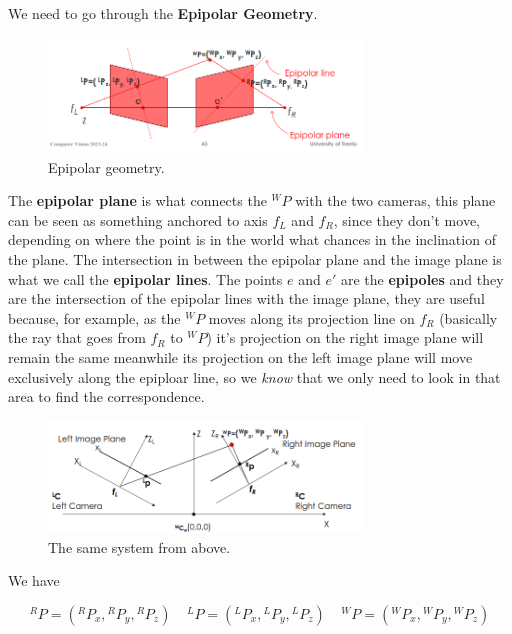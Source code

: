 We need to go through the \textbf{Epipolar Geometry}.

\begin{figure}[H]
    \centering
    \includegraphics[width=0.75\textwidth]{Figures/epipolar.png}
    \caption{Epipolar geometry.}
    \label{fig:epipolar}
\end{figure}

The \textbf{epipolar plane} is what connects the  \({}^WP\) with the two cameras, this plane can be seen as something anchored to axis \(f_L\) and \(f_R\), since they don't move, depending on where the point is in the world what chances in the inclination of the plane. The intersection in between the epipolar plane and the image plane is what we call the \textbf{epipolar lines}. The points \(e\) and \(e'\) are the \textbf{epipoles} and they are the intersection of the epipolar lines with the image plane, they are useful because, for example, as the \({}^WP\) moves along its projection line on \(f_R\) (basically the ray that goes from \(f_R\) to \({}^WP\)) it's projection on the right image plane will remain the same meanwhile its projection on the left image plane will move exclusively along the epiploar line, so we \textit{know} that we only need to look in that area to find the correspondence. 

\begin{figure}[H]
    \centering
    \includegraphics[width=0.75\textwidth]{Figures/epipolar_above.png}
    \caption{The same system from above.}
    \label{fig:epipolar_above}
\end{figure}

We have 


\[{}^RP = ({}^RP_x, {}^RP_y, {}^RP_z) \;\;\;\;
{}^LP = ({}^LP_x, {}^LP_y, {}^LP_z)\;\;\;\;
{}^WP = ({}^WP_x, {}^WP_y, {}^WP_z)\]


